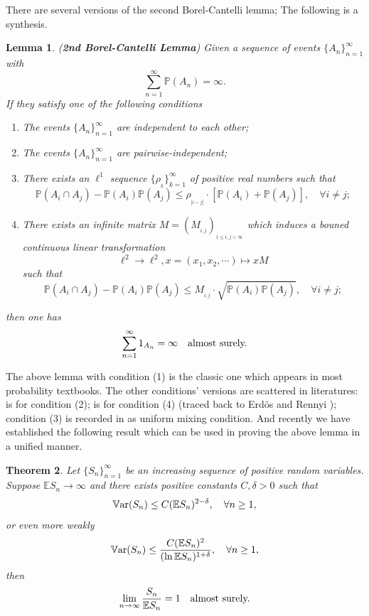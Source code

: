 \documentclass{article}
\newtheorem{thm}{Theorem}[section]
\newtheorem{lem}[thm]{Lemma}
\numberwithin{equation}{section}
\newcommand{\Var}{{\mathbb{V}}{\rm ar}}
\newcommand{\Enum}{\mathbb{E}}
\newcommand{\Pnum}{\mathbb{P}}
\begin{document}
There are several versions of the second Borel-Cantelli lemma; The following is a synthesis.
\begin{lem} (\textbf{2nd Borel-Cantelli Lemma})
Given a sequence of events $\{A_n\}_{n=1}^\infty$ with
\begin{equation}\label{eq: prob-sum-infinite}
\sum_{n=1}^\infty \Pnum (A_n)=\infty.
\end{equation}
If they satisfy one of the following conditions
\begin{enumerate}
  \item[{\rm (1)}] The events $\{A_n\}_{n=1}^\infty$ are independent to each other;
  \item[{\rm (2)}] The events $\{A_n\}_{n=1}^\infty$ are pairwise-independent;
  \item[{\rm (3)}] There exists an $\ell^1$ sequence $\{\rho_{_k}\}_{k=1}^\infty$ of positive real numbers such that
$$
\Pnum (A_i \cap A_j) -\Pnum (A_i)\Pnum (A_j) \leq \rho_{_{|i-j|}} \cdot [\Pnum (A_i)+\Pnum (A_j)], \quad \forall i \neq j;
$$
  \item[{\rm (4)}] There exists an infinite matrix $M=(M_{_{i,j}})_{_{1 \leq i, j <\infty}}$ which induces a bouned continuous linear transformation
$$
\ell^2 \to \ell^2, x=(x_1, x_2, \cdots) \mapsto x M
$$
such that
$$
\Pnum (A_i \cap A_j) -\Pnum (A_i)\Pnum (A_j) \leq M_{_{i,j}} \cdot \sqrt{\Pnum (A_i)\Pnum (A_j)}, \quad \forall i \neq j;
$$
\end{enumerate}
then one has
\begin{equation}\label{eq: a.s.-infinite}
\sum_{n=1}^\infty 1_{A_n}=\infty \quad \hbox{almost surely.}
\end{equation}
\end{lem}
The above lemma with condition {\rm (1)} is the classic one which appears in most probability textbooks. The other conditions' versions are scattered in literatures:
\cite[Theorem 2.3.9]{Durrett} is for condition {\rm (2)}; \cite[Theorem 3.2]{Simon} is for condition {\rm (4)} (traced back to Erd\"{o}s and Rennyi \cite{ER}); condition 
{\rm (3)} is recorded in \cite{DMR2022} as uniform mixing condition. And recently we have established the following result which can be used in proving the above lemma 
in a unified manner.
\begin{thm}\cite{XZ}
Let $\{S_n\}_{n=1}^\infty$ be an increasing sequence of positive random variables. Suppose $\Enum S_n \to \infty$ and  there exists positive constants $C, \delta>0$ such 
that
\begin{equation}
\Var (S_n) \leq C(\Enum S_n)^{2 -\delta}, \quad \forall n \geq 1,
\end{equation}
or even more weakly
\begin{equation}
\Var (S_n) \leq \frac{C(\Enum S_n)^2}{(\ln \Enum S_n)^{1+\delta}}, \quad \forall n \geq 1,
\end{equation}
then
\begin{equation}
\lim_{n \to \infty} \frac{S_n}{\Enum S_n}=1  \quad \hbox{almost surely.}
\end{equation}
\end{thm}
\end{document}
